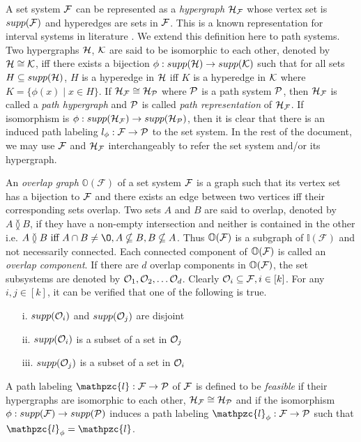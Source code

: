 \documentclass{fsttcs}
\def\cF{{\cal F}}
\def\cH{{\cal H}}
\def\cK{{\cal K}}
\def\cO{{\cal O}}
\def\cP{{\cal P}}
\def\F{{\mathcal F}}
\def\H{{\mathcal H}}
\def\bI{\mathbb I}
\def\bO{\mathbb O}
\def\cl{\mathpzc{l}}
\def\overlap{\between}
\begin{document}
\noindent
A set system $\cF$ can be represented as a {\em hypergraph} $\H_\cF$ whose
vertex set is $supp(\cF)$ and hyperedges are sets in $\cF$. This is a
known representation for interval systems in literature \cite{bls99}.
We extend this definition here to path systems.  Two hypergraphs
$\cH$, $\cK$ are said to be isomorphic to each other, denoted by $\cH
\cong \cK$, iff there exists a bijection $\phi: supp(\cH) \rightarrow
supp(\cK)$ such that for all sets $H \subseteq supp(\cH)$, $H$ is a
hyperedge in $\cH$ iff $K$ is a hyperedge in $\cK$ where $K =
\{\phi(x) \mid x \in H\}$.  If $\H_\cF \cong \H_\cP$ where $\cP$ is a  path system $\cP$, then $\H_\cF$ is called a {\em path
  hypergraph}
and $\cP$ is called {\em path representation} of $\H_\cF$. If
isomorphism is $\phi: supp(\H_\cF) \rightarrow supp(\H_\cP)$, then it
is clear that there is an induced path labeling $l_\phi: \cF
\rightarrow \cP$ to the
set system. In the rest of the document, we may use $\cF$ and
$\cH_\cF$ interchangeably to refer the set system and/or its hypergraph.

\noindent
An {\em overlap graph} $\bO(\F)$ of a set system $\cF$ is a graph such
that its vertex set has a bijection to $\cF$ and there exists an edge
between two vertices iff their corresponding sets overlap. Two sets
$A$ and $B$ are said to overlap, denoted by $A \overlap B$, if they
have a non-empty intersection and neither is contained in the other
i.e. $A \overlap B \text{ iff } A \cap B \ne \O, A \nsubseteq B, B
\nsubseteq A$. Thus $\bO(\cF)$ is a subgraph of $\bI(\F)$ and not
necessarily connected. Each connected component of $\bO(\cF)$ is
called an {\em overlap component}. If there are $d$ overlap components
in $\bO(\cF)$, the set subsystems are denoted by $\cO_1, \cO_2, \ldots
\cO_d$. Clearly $\cO_i \subseteq \F, i \in [k]$. For any $i, j \in [k]$,
it can be verified that one of the following is true.
\begin{enumerate}
\item[i.] $supp(\cO_i)$ and $supp(\cO_j)$ are disjoint
\item[ii.] $supp(\cO_i)$ is a subset of a set in $\cO_j$
\item[iii.] $supp(\cO_j)$ is a subset of a set in $\cO_i$
\end{enumerate}
 
\noindent
A path labeling $\cl: \cF \rightarrow \cP$ of $\cF$ is defined to be {\em
  feasible} if their hypergraphs are isomorphic to each other,
$\cH_\cF \cong \cH_\cP$ and if the isomorphism $\phi: supp(\cF)
\rightarrow supp(\cP)$ induces a path labeling $\cl_\phi: \cF
\rightarrow \cP$ such that $\cl_\phi = \cl$. 
\end{document}
